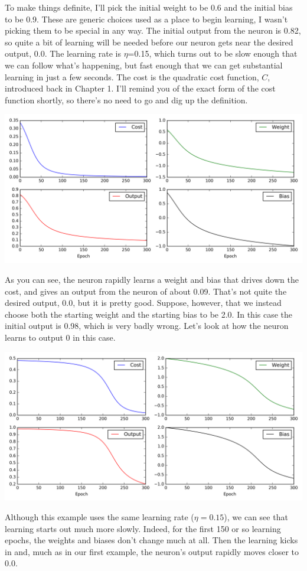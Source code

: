 \documentclass[a4paper,twoside,10pt]{book}
\begin{document}
To make things definite, I'll pick the initial weight to be 0.6 and the initial bias to be 0.9. These are generic choices used as a place to begin learning, I wasn't picking them to be special in any way. The initial output from the neuron is 0.82, so quite a bit of learning will be needed before our neuron gets near the desired output, 0.0. 
The learning rate is $\eta$=0.15, which turns out to be slow enough that we can follow what's happening, but fast enough that we can get substantial learning in just a few seconds. The cost is the quadratic cost function, $C$, introduced back in Chapter 1. I'll remind you of the exact form of the cost function shortly, so there's no need to go and dig up the definition. %
\begin{center}%
	\includegraphics[width=0.75\linewidth]{./figures/ch3/animation_31}
\end{center}
As you can see, the neuron rapidly learns a weight and bias that drives down the cost, and gives an output from the neuron of about 0.09. That's not quite the desired output, 0.0, but it is pretty good. Suppose, however, that we instead choose both the starting weight and the starting bias to be 2.0. In this case the initial output is 0.98, which is very badly wrong. Let's look at how the neuron learns to output 0 in this case. %
\begin{center}%
	\includegraphics[width=0.75\linewidth]{./figures/ch3/animation_32}
\end{center}
Although this example uses the same learning rate ($\eta=0.15$), we can see that learning starts out much more slowly. Indeed, for the first 150 or so learning epochs, the weights and biases don't change much at all. Then the learning kicks in and, much as in our first example, the neuron's output rapidly moves closer to 0.0.
\end{document}
